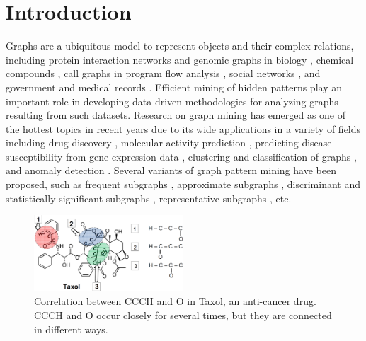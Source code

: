 \section{Introduction}
\label{sec:intro}

Graphs are a ubiquitous model to represent objects and their complex relations,
including protein interaction networks and genomic graphs in biology \cite{RHS13},
chemical compounds \cite{WMFP05}, call graphs in program flow analysis \cite{control},
social networks \cite{Kempe}, and government and medical records \cite{SH12}.
Efficient mining of hidden patterns play an important role in developing data-driven
methodologies for analyzing graphs
resulting from such datasets.
Research on graph mining has emerged as one of the hottest topics in recent years due to its wide applications in a variety of fields including
drug discovery \cite{KK01,NK05,YH02}, molecular activity prediction \cite{JinYW10,TCG09},
predicting disease susceptibility from gene expression data \cite{RHS13,DI11}, clustering and classification of graphs \cite{DKWK05,YCHY08}, and anomaly detection \cite{ATK15}.
Several variants of graph pattern mining have been proposed,
such as frequent subgraphs \cite{YH02,EASK14}, approximate subgraphs \cite{KYW10}, discriminant and statistically significant subgraphs \cite{TCG09,RS09,YCHY08}, representative subgraphs \cite{CHSBZ08,ZYL09}, etc.
%
\begin{figure}[t!]
\vspace{-2mm}
\centering
\includegraphics[width=2.2in]{images/taxol.pdf}
\caption{Correlation between {\sf CCCH} and {\sf O} in {\sf Taxol}, an anti-cancer drug. {\sf CCCH} and {\sf O}
occur closely for several times, but they are connected in different ways.}
\label{fig:taxol}
\vspace{-0.10in}
\end{figure}
%


